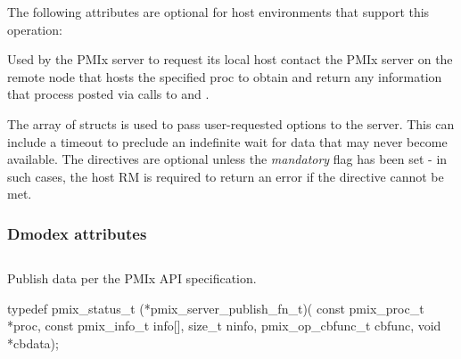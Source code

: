 
\reqattrend

\optattrstart
The following attributes are optional for host environments that support this operation:


\optattrend

\descr

Used by the \ac{PMIx} server to request its local host contact the \ac{PMIx} server on the remote node that hosts the specified proc to obtain and return any information that process posted via calls to  and .

The array of  structs is used to pass user-requested options to the server.
This can include a timeout to preclude an indefinite wait for data that may never become available.
The directives are optional unless the \emph{mandatory} flag has been set - in such cases, the host \ac{RM} is required to return an error if the directive cannot be met.

\subsubsection{Dmodex attributes}

%


\subsection{}

\summary

Publish data per the PMIx API specification.

\format

\cspecificstart
\begin{codepar}
typedef pmix_status_t (*pmix_server_publish_fn_t)(
                             const pmix_proc_t *proc,
                             const pmix_info_t info[],
                             size_t ninfo,
                             pmix_op_cbfunc_t cbfunc,
                             void *cbdata);
\end{codepar}
\cspecificend

